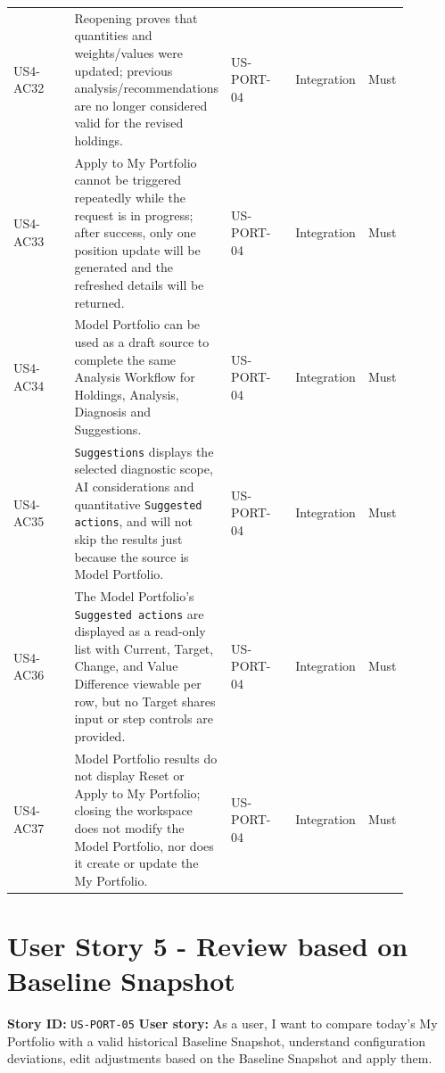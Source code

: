 \begin{longtable}{L{0.18\linewidth}L{0.30\linewidth}L{0.18\linewidth}L{0.12\linewidth}L{0.10\linewidth}}
US4-AC32 & Reopening proves that quantities and weights/\allowbreak{}values were updated; previous analysis/\allowbreak{}recommendations are no longer considered valid for the revised holdings. & US-PORT-04 & Integration & Must \\
US4-AC33 & Apply to My Portfolio cannot be triggered repeatedly while the request is in progress; after success, only one position update will be generated and the refreshed details will be returned. & US-PORT-04 & Integration & Must \\
US4-AC34 & Model Portfolio can be used as a draft source to complete the same Analysis Workflow for Holdings, Analysis, Diagnosis and Suggestions. & US-PORT-04 & Integration & Must \\
US4-AC35 & \texttt{Suggestions} displays the selected diagnostic scope, AI considerations and quantitative \texttt{Suggested actions}, and will not skip the results just because the source is Model Portfolio. & US-PORT-04 & Integration & Must \\
US4-AC36 & The Model Portfolio's \texttt{Suggested actions} are displayed as a read-only list with Current, Target, Change, and Value Difference viewable per row, but no Target shares input or step controls are provided. & US-PORT-04 & Integration & Must \\
US4-AC37 & Model Portfolio results do not display Reset or Apply to My Portfolio; closing the workspace does not modify the Model Portfolio, nor does it create or update the My Portfolio. & US-PORT-04 & Integration & Must \\
\bottomrule
\end{longtable}
\endgroup
\prdhr
\hypertarget{us-port-05}{}
\section{User Story 5 - Review based on Baseline Snapshot}
\textbf{Story ID:} \texttt{US-PORT-05}
\textbf{User story:} As a user, I want to compare today's My Portfolio with a valid historical Baseline Snapshot, understand configuration deviations, edit adjustments based on the Baseline Snapshot and apply them.
